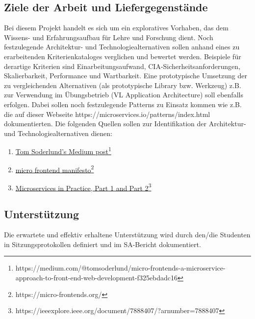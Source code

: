 \subsection{Ziele der Arbeit und Liefergegenstände}
Bei diesem Projekt handelt es sich um ein exploratives Vorhaben, das dem Wissens- und Erfahrungsaufbau für Lehre und Forschung dient. 
Noch festzulegende Architektur- und Technologiealternativen sollen anhand eines zu erarbeitenden Kriterienkataloges verglichen und bewertet werden. Beispiele für derartige Kriterien sind Einarbeitungsaufwand,  CIA-Sicherheitsanforderungen, Skalierbarkeit, Performance und Wartbarkeit. 
Eine prototypische Umsetzung der zu vergleichenden Alternativen (als prototypische Library bzw. Werkzeug) z.B. zur Verwendung im Übungsbetrieb (VL Application Architecture) soll ebenfalls erfolgen. Dabei sollen noch festzulegende Patterns zu Einsatz kommen wie z.B. die auf dieser Webseite https://microservices.io/patterns/index.html dokumentierten.  
Die folgenden Quellen sollen zur Identifikation der  Architektur- und Technologiealternativen dienen: 
\begin{enumerate}
    \item \href{https://medium.com/@tomsoderlund/micro-frontends-a-microservice-approach-to-front-end-web-development-f325ebdadc16}{Tom Soderlund's Medium post}\footnote{https://medium.com/@tomsoderlund/micro-frontends-a-microservice-approach-to-front-end-web-development-f325ebdadc16}
    \item \href{https://micro-frontends.org/}{micro frontend manifesto}\footnote{https://micro-frontends.org/}
    \item \href{https://ieeexplore.ieee.org/document/7888407/?arnumber=7888407}{Microservices in Practice, Part 1 and Part 2}\footnote{https://ieeexplore.ieee.org/document/7888407/?arnumber=7888407}
\end{enumerate}

\subsection{Unterstützung}
Die erwartete und effektiv erhaltene Unterstützung wird durch den/die Studenten in Sitzungsprotokollen definiert und im SA-Bericht dokumentiert.

